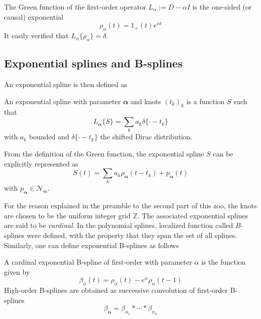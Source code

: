 \begin{example}
  The Green function of the first-order operator $L_{\alpha} := D-\alpha I$ is the one-sided (or causal) exponential
  \begin{equation*}
    \rho_{\alpha}(t) = 1_+(t)e^{\alpha t}
  \end{equation*}
  It easily verified that $L_{\alpha}\{\rho_{\alpha}\} = \delta$.
\end{example}

\subsection{Exponential splines and B-splines}

An exponential spline is then defined as
\begin{deftn}\label{def:exponential-spline}
  An exponential spline with parameter $\bm{\alpha}$ and knots $(t_{k})_{k}$ is a function $S$ such that
  \begin{equation*}
    L_{\bm{\alpha}}\{S\} = \sum_{k} a_k \delta\{\cdot-t_k\}
  \end{equation*}
  with $a_k$ bounded and $\delta\{\cdot-t_k\}$ the shifted Dirac distribution.
\end{deftn}

From the definition of the Green function, the exponential spline $S$ can be explicitly represented as 
\begin{equation*}
  S(t) = \sum_{k} a_k \rho_{\bm{\alpha}}(t-t_k) + p_{\bm{\alpha}}(t)
\end{equation*}
with $p_{\bm{\alpha}} \in \mathcal{N}_{\bm{\alpha}}$. 

For the reason explained in the preamble to the second part of this zoo, the knots are chosen to be the uniform integer 
grid $\mathbb{Z}$. The associated exponential splines are said to be \emph{cardinal}. In the polynomial splines, 
localized function called $B$-splines were defined, with the property that they span the set of all splines. Similarly, 
one can define exponential B-splines as follows

\begin{deftn}\label{def:exponential-B-spline}
  A cardinal exponential B-spline of first-order with parameter $\alpha$ is the function given by
  \begin{equation*}
    \beta_{\alpha}(t) = \rho_{\alpha}(t) - e^{\alpha} \rho_{\alpha}(t-1)
  \end{equation*}
  High-order B-splines are obtained as successive convolution of first-order B-splines
  \begin{equation*}
    \beta_{\bm{\alpha}} = \beta_{\alpha_1}*\cdots*\beta_{\alpha_n}
  \end{equation*}
\end{deftn}
